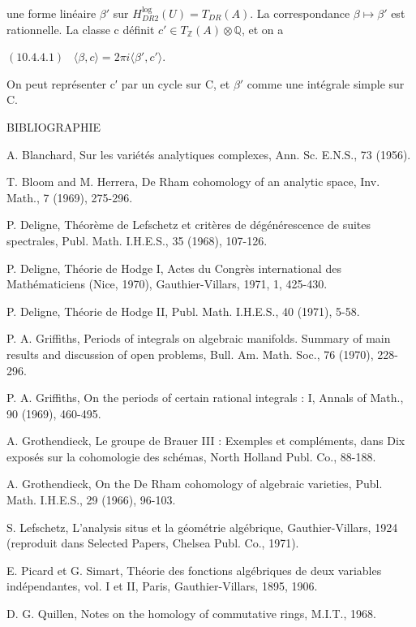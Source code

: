 \documentclass[11pt,twoside]{article}
\newcommand{\DFormula}[1]{%
  \par\smallskip\noindent\hspace*{0pt}\(\displaystyle #1\)\par\smallskip
}
\begin{document}
une forme linéaire \(\beta ′\) sur \(H_{DR2}^{\operatorname{log}}(U)=T_{DR}(A)\). La correspondance \(\beta ↦\beta ′\) est rationnelle. La classe c définit \(c′\in T_{\mathbb{Z}}(A)\otimes \mathbb{Q}\), et on a\par
\par\medskip
\DFormula{(10.4.4.1)\,\,\,\,\,⟨\beta ,c⟩=2\pi i⟨\beta ′,c′⟩.}
\par\medskip
On peut représenter c′ par un cycle sur C, et \(\beta ′\) comme une intégrale simple sur C.\par
\par\medskip
BIBLIOGRAPHIE\par
\par\medskip
[1] A. Blanchard, Sur les variétés analytiques complexes, Ann. Sc. E.N.S., 73 (1956).\par
[2] T. Bloom and M. Herrera, De Rham cohomology of an analytic space, Inv. Math., 7 (1969), 275-296.\par
[3] P. Deligne, Théorème de Lefschetz et critères de dégénérescence de suites spectrales, Publ. Math. I.H.E.S., 35 (1968), 107-126.\par
[4] P. Deligne, Théorie de Hodge I, Actes du Congrès international des Mathématiciens (Nice, 1970), Gauthier-Villars, 1971, 1, 425-430.\par
[5] P. Deligne, Théorie de Hodge II, Publ. Math. I.H.E.S., 40 (1971), 5-58.\par
[6] P. A. Griffiths, Periods of integrals on algebraic manifolds. Summary of main results and discussion of open problems, Bull. Am. Math. Soc., 76 (1970), 228-296.\par
[7] P. A. Griffiths, On the periods of certain rational integrals : I, Annals of Math., 90 (1969), 460-495.\par
[8] A. Grothendieck, Le groupe de Brauer III : Exemples et compléments, dans Dix exposés sur la cohomologie des schémas, North Holland Publ. Co., 88-188.\par
[9] A. Grothendieck, On the De Rham cohomology of algebraic varieties, Publ. Math. I.H.E.S., 29 (1966), 96-103.\par
[10] S. Lefschetz, L’analysis situs et la géométrie algébrique, Gauthier-Villars, 1924 (reproduit dans Selected Papers, Chelsea Publ. Co., 1971).\par
[11] E. Picard et G. Simart, Théorie des fonctions algébriques de deux variables indépendantes, vol. I et II, Paris, Gauthier-Villars, 1895, 1906.\par
[12] D. G. Quillen, Notes on the homology of commutative rings, M.I.T., 1968.\par
\end{document}
